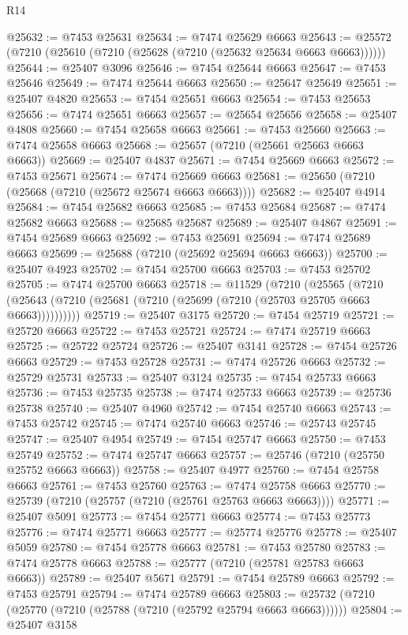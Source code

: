 \begin{lexlean}{R14}
\begin{coremodule}
@25632 := @7453 @25631
@25634 := @7474 @25629 @6663
@25643 := @25572 (@7210 (@25610 (@7210 (@25628 (@7210 (@25632 @25634 @6663 @6663))))))
@25644 := @25407 @3096
@25646 := @7454 @25644 @6663
@25647 := @7453 @25646
@25649 := @7474 @25644 @6663
@25650 := @25647 @25649
@25651 := @25407 @4820
@25653 := @7454 @25651 @6663
@25654 := @7453 @25653
@25656 := @7474 @25651 @6663
@25657 := @25654 @25656
@25658 := @25407 @4808
@25660 := @7454 @25658 @6663
@25661 := @7453 @25660
@25663 := @7474 @25658 @6663
@25668 := @25657 (@7210 (@25661 @25663 @6663 @6663))
@25669 := @25407 @4837
@25671 := @7454 @25669 @6663
@25672 := @7453 @25671
@25674 := @7474 @25669 @6663
@25681 := @25650 (@7210 (@25668 (@7210 (@25672 @25674 @6663 @6663))))
@25682 := @25407 @4914
@25684 := @7454 @25682 @6663
@25685 := @7453 @25684
@25687 := @7474 @25682 @6663
@25688 := @25685 @25687
@25689 := @25407 @4867
@25691 := @7454 @25689 @6663
@25692 := @7453 @25691
@25694 := @7474 @25689 @6663
@25699 := @25688 (@7210 (@25692 @25694 @6663 @6663))
@25700 := @25407 @4923
@25702 := @7454 @25700 @6663
@25703 := @7453 @25702
@25705 := @7474 @25700 @6663
@25718 := @11529
    (@7210
      (@25565
        (@7210 (@25643 (@7210 (@25681 (@7210 (@25699 (@7210 (@25703 @25705 @6663 @6663))))))))))
@25719 := @25407 @3175
@25720 := @7454 @25719
@25721 := @25720 @6663
@25722 := @7453 @25721
@25724 := @7474 @25719 @6663
@25725 := @25722 @25724
@25726 := @25407 @3141
@25728 := @7454 @25726 @6663
@25729 := @7453 @25728
@25731 := @7474 @25726 @6663
@25732 := @25729 @25731
@25733 := @25407 @3124
@25735 := @7454 @25733 @6663
@25736 := @7453 @25735
@25738 := @7474 @25733 @6663
@25739 := @25736 @25738
@25740 := @25407 @4960
@25742 := @7454 @25740 @6663
@25743 := @7453 @25742
@25745 := @7474 @25740 @6663
@25746 := @25743 @25745
@25747 := @25407 @4954
@25749 := @7454 @25747 @6663
@25750 := @7453 @25749
@25752 := @7474 @25747 @6663
@25757 := @25746 (@7210 (@25750 @25752 @6663 @6663))
@25758 := @25407 @4977
@25760 := @7454 @25758 @6663
@25761 := @7453 @25760
@25763 := @7474 @25758 @6663
@25770 := @25739 (@7210 (@25757 (@7210 (@25761 @25763 @6663 @6663))))
@25771 := @25407 @5091
@25773 := @7454 @25771 @6663
@25774 := @7453 @25773
@25776 := @7474 @25771 @6663
@25777 := @25774 @25776
@25778 := @25407 @5059
@25780 := @7454 @25778 @6663
@25781 := @7453 @25780
@25783 := @7474 @25778 @6663
@25788 := @25777 (@7210 (@25781 @25783 @6663 @6663))
@25789 := @25407 @5671
@25791 := @7454 @25789 @6663
@25792 := @7453 @25791
@25794 := @7474 @25789 @6663
@25803 := @25732 (@7210 (@25770 (@7210 (@25788 (@7210 (@25792 @25794 @6663 @6663))))))
@25804 := @25407 @3158

\end{coremodule}
\end{lexlean}
